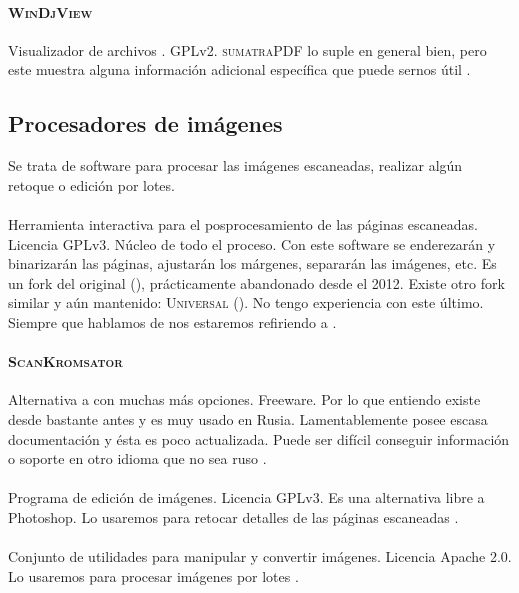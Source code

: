 \documentclass[%
	a5paper,
	10pt,
	twoside,
	openright,
	final,
]{memoir}
\begin{document}
{	\paragraph{\textsc{WinDjView}} Visualizador de archivos \djvu. GPLv2. \textsc{sumatraPDF} lo suple en general bien, pero este muestra alguna información adicional específica que puede sernos útil \cite{WinDjView}.

	\subsection{Procesadores de imágenes} Se trata de software para procesar las imágenes escaneadas, realizar algún retoque o edición por lotes.
	\paragraph{\scantailorAdvanced} Herramienta interactiva para el posprocesamiento de las páginas escaneadas. Licencia GPLv3. Núcleo de todo el proceso. Con este software se enderezarán y binarizarán las páginas, ajustarán los márgenes, separarán las imágenes, etc. Es un fork del original \scantailor (\cite{ScanTailor}), prácticamente abandonado desde el 2012. Existe otro fork similar y aún mantenido: \textsc{\scantailor Universal} (\cite{ScanTailorUniversal}). No tengo experiencia con este último. Siempre que hablamos de \scantailor nos estaremos refiriendo a \scantailorAdvanced \cite{ScanTailorAdvanced}.
	\paragraph{\textsc{ScanKromsator}} Alternativa a \scantailor con muchas más opciones. Freeware. Por lo que entiendo existe desde bastante antes y es muy usado en Rusia. Lamentablemente posee escasa documentación y ésta es poco actualizada. Puede ser difícil conseguir información o soporte en otro idioma que no sea ruso \cite{ScanKromsator}.
	\paragraph{\gimp} Programa de edición de imágenes. Licencia GPLv3. Es una alternativa libre a Photoshop. Lo usaremos para retocar detalles de las páginas escaneadas \cite{GIMP}.
	\paragraph{\imagemagick} Conjunto de utilidades para manipular y convertir imágenes. Licencia Apache 2.0. Lo usaremos para procesar imágenes por lotes \cite{ImageMagick}.

}
\end{document}
